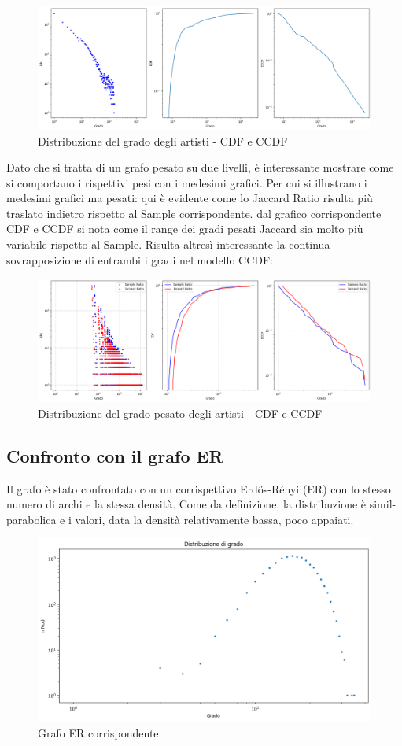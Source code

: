 \documentclass[sigchi]{acmart}
\begin{document}
\begin{figure}[H]
\centering
\includegraphics[width=0.45
\textwidth]{../network_analysis/plots/2_2/plotDist.png}
\caption{Distribuzione del grado degli artisti - CDF e CCDF}
\label{fig:plotDist}
\end{figure}

\noindent Dato che si tratta di un grafo pesato su due livelli, è interessante mostrare come si comportano i rispettivi pesi con i medesimi grafici. Per cui si illustrano i medesimi grafici ma pesati: qui è evidente come lo Jaccard Ratio risulta più traslato indietro rispetto al Sample corrispondente. dal grafico corrispondente CDF e CCDF si nota come il range dei gradi pesati Jaccard sia molto più variabile rispetto al Sample. Risulta altresì interessante la continua sovrapposizione di entrambi i gradi nel modello CCDF:

\begin{figure}[H]
\centering
\includegraphics[width=0.45
\textwidth]{../network_analysis/plots/2_2/wPlotDist.png}
\caption{Distribuzione del grado pesato degli artisti - CDF e CCDF}
\label{fig:wPlotDist}
\end{figure}

\subsection{Confronto con il grafo ER}

Il grafo è stato confrontato con un corrispettivo Erdős-Rényi (ER) con lo stesso numero di archi e la stessa densità. Come da definizione, la distribuzione è simil-parabolica e i valori, data la densità relativamente bassa, poco appaiati.

\begin{figure}[H]
\centering
\includegraphics[width=0.45
\textwidth]{../network_analysis/plots/2_2/ERGrDist.png}
\caption{Grafo ER corrispondente}
\label{fig:ERGrDist}
\end{figure}
\end{document}
